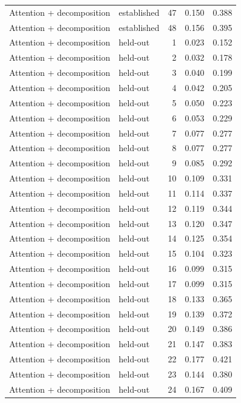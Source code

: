 \begin{tabular}{llrrr}
Attention + decomposition & established & 47 & 0.150 & 0.388 \\
Attention + decomposition & established & 48 & 0.156 & 0.395 \\
Attention + decomposition & held-out & 1 & 0.023 & 0.152 \\
Attention + decomposition & held-out & 2 & 0.032 & 0.178 \\
Attention + decomposition & held-out & 3 & 0.040 & 0.199 \\
Attention + decomposition & held-out & 4 & 0.042 & 0.205 \\
Attention + decomposition & held-out & 5 & 0.050 & 0.223 \\
Attention + decomposition & held-out & 6 & 0.053 & 0.229 \\
Attention + decomposition & held-out & 7 & 0.077 & 0.277 \\
Attention + decomposition & held-out & 8 & 0.077 & 0.277 \\
Attention + decomposition & held-out & 9 & 0.085 & 0.292 \\
Attention + decomposition & held-out & 10 & 0.109 & 0.331 \\
Attention + decomposition & held-out & 11 & 0.114 & 0.337 \\
Attention + decomposition & held-out & 12 & 0.119 & 0.344 \\
Attention + decomposition & held-out & 13 & 0.120 & 0.347 \\
Attention + decomposition & held-out & 14 & 0.125 & 0.354 \\
Attention + decomposition & held-out & 15 & 0.104 & 0.323 \\
Attention + decomposition & held-out & 16 & 0.099 & 0.315 \\
Attention + decomposition & held-out & 17 & 0.099 & 0.315 \\
Attention + decomposition & held-out & 18 & 0.133 & 0.365 \\
Attention + decomposition & held-out & 19 & 0.139 & 0.372 \\
Attention + decomposition & held-out & 20 & 0.149 & 0.386 \\
Attention + decomposition & held-out & 21 & 0.147 & 0.383 \\
Attention + decomposition & held-out & 22 & 0.177 & 0.421 \\
Attention + decomposition & held-out & 23 & 0.144 & 0.380 \\
Attention + decomposition & held-out & 24 & 0.167 & 0.409 \\

\end{tabular}
